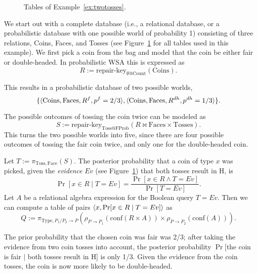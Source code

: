 \begin{example}
\begin{figure}
\caption{Tables of Example~\ref{ex:twotosses}.}
\label{fig:twotosses_tables}
\end{figure}


We start out with a complete database (i.e., a relational database, or a probabilistic database with one possible world of probability 1) consisting of
three relations, Coins, Faces, and Tosses (see Figure~\ref{fig:twotosses_tables} for all tables used in this example).
%
We first pick a coin from the bag and model that
the coin be either fair or double-headed.
In probabilistic WSA this is expressed as
\[
R := \mbox{repair-key}_{\emptyset@\mathrm{Count}}(\mathrm{Coins}).
\]

This results in a probabilistic database of two possible worlds,
\[
\{ \langle \mbox{Coins}, \mbox{Faces}, R^f, p^{f}=2/3 \rangle,
   \langle \mbox{Coins}, \mbox{Faces}, R^{dh}, p^{dh}=1/3 \rangle \}.
\]

The possible outcomes of tossing the coin twice can be modeled as
\[
S := \mbox{repair-key}_{\mathrm{Toss@FProb}}(
   R \bowtie \mathrm{Faces} \times \mathrm{Tosses}).
\]
This turns the two possible worlds into five, since there are four possible outcomes of tossing the fair coin twice, and only one for the double-headed coin.

Let $T := \pi_{\mathrm{Toss}, \mathrm{Face}}(S)$.
The posterior probability
that a coin of type $x$ was picked, given the {\em evidence}\/ $Ev$ (see Figure~\ref{fig:twotosses_tables}) that both tosses result in
H, is
\[
\Pr[x \in R \mid T = Ev] = \frac{\Pr[x \in R \land T = Ev]}{\Pr[T=Ev]}.
\]
Let $A$ be a relational algebra expression for the Boolean query $T=Ev$.
Then we can compute a table of pairs
$\langle x, \mbox{Pr}[x \in R \mid T = Ev] \rangle$ as
\[
Q := \pi_{\mathrm{Type}, P_1/P_2 \rightarrow P}(\rho_{P \rightarrow P_1}(\mbox{conf}(R \times A)) \times \rho_{P \rightarrow P_2}(\mbox{conf}(A))).
\]

The prior probability that the chosen coin was fair was 2/3; after taking the
evidence from two coin tosses into account, the posterior probability
$\Pr$[the coin is fair $|$ both tosses result in H] is only 1/3.
Given the evidence from the coin tosses, the coin is now more likely to be double-headed.
\punto
\end{example}


